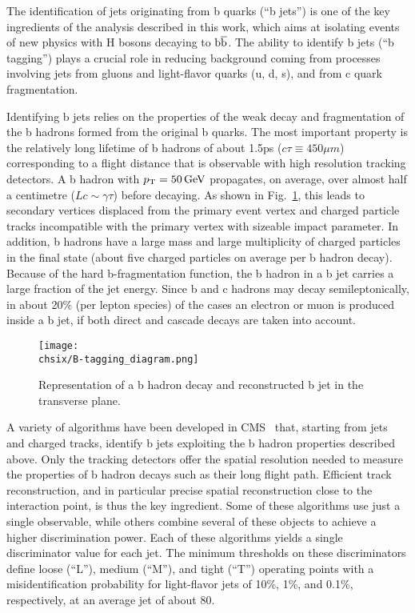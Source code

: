 The identification of jets originating from b quarks (``b jets'') is one of the key ingredients of the analysis described in this work, which aims at isolating events of new physics with H bosons decaying to ${\mathrm{b}\overline{\mathrm{b}}}$. The ability to identify b jets (``b tagging'') plays a crucial role in reducing background coming from processes involving jets from gluons and light-flavor quarks (u, d, s), and from c quark fragmentation.

Identifying b jets relies on the properties of the weak decay and fragmentation of the b hadrons formed from the original b quarks. The most important property is the relatively long lifetime of b hadrons of about 1.5\unit{ps} ($c\tau \equiv 450\mu m$) corresponding to a flight distance that is observable with high resolution tracking detectors. A b hadron with $p_{\mathrm{T}} = 50\,\text{Ge\hspace{-.08em}V}$ propagates, on average, over almost half a centimetre ($Lc \sim \gamma\tau$) before decaying. As shown in Fig.~\ref{fig:bjet}, this leads to secondary vertices displaced from the primary event vertex and charged particle tracks incompatible with the primary vertex with sizeable impact parameter. In addition, b hadrons have a large mass and large multiplicity of charged particles in the final state (about five charged particles on average per b hadron decay). Because of the hard b-fragmentation function, the b hadron in a b jet carries a large fraction of the jet energy. Since b and c hadrons may decay semileptonically, in about 20\% (per lepton species) of the cases an electron or muon is produced inside a b jet, if both direct and cascade decays are taken into account.

\begin{figure}[!htb]
 \begin{center}
  \texttt{[image: \\chsix/B-tagging\_diagram.png]}
 \end{center}
 \caption{Representation of a b hadron decay and reconstructed b jet in the transverse plane.}
 \label{fig:bjet}
\end{figure}

A variety of algorithms have been developed in CMS~\cite{Chatrchyan:2012jua} that, starting from jets and charged tracks, identify b jets exploiting the b hadron properties described above.
Only the tracking detectors offer the spatial resolution needed to measure the properties of b hadron decays such as their long flight path. Efficient track reconstruction, and in particular precise spatial reconstruction close to the interaction point, is thus the key ingredient. 
Some of these algorithms use just a single observable, while others combine several of these objects to achieve a higher discrimination power. Each of these algorithms yields a single discriminator value for each jet. The minimum thresholds on these discriminators define loose (``L''), medium (``M''), and tight (``T'') operating points with a misidentification probability for light-flavor jets of 10\%, 1\%, and 0.1\%, respectively, at an average jet \pt of about 80\GeV.


